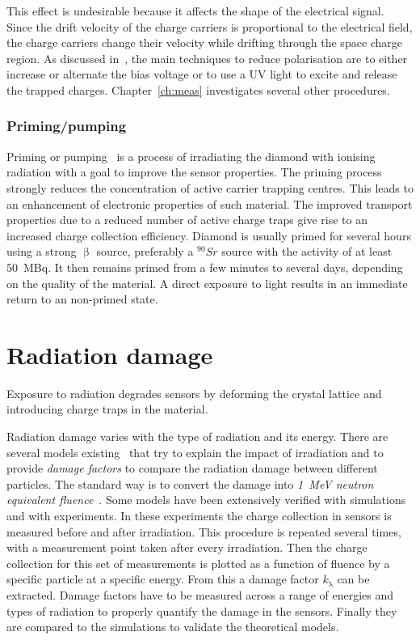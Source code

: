 This effect is undesirable because it affects the shape of the electrical signal. Since the drift velocity of the charge carriers is proportional to the electrical field, the charge carriers change their velocity while drifting through the space charge region. As discussed in~\cite{Guthoff:1977429}, the main techniques to reduce polarisation are to either increase or alternate the bias voltage or to use a UV light to excite and release the trapped charges. Chapter~\ref{ch:meas} investigates several other procedures.


\subsubsection{Priming/pumping}
Priming or pumping~\cite{pumping:00000} is a process of irradiating the diamond with ionising radiation with a goal to improve the sensor properties. The priming process strongly reduces the concentration of active carrier trapping centres. This leads to an enhancement of electronic properties of such material. The improved transport properties due to a reduced number of active charge traps give rise to an increased charge collection efficiency. Diamond is usually primed for several hours using a strong $\upbeta$ source, preferably a $^{90}Sr$ source with the activity of at least 50~MBq. It then remains primed from a few minutes to several days, depending on the quality of the material. A direct exposure to light results in an immediate return to an non-primed state.



\section{Radiation damage}
\label{sec:raddam}
Exposure to radiation degrades sensors by deforming the crystal lattice and introducing charge traps in the material. 

Radiation damage varies with the type of radiation and its energy. There are several models existing~\cite{2002NIMPA,Guthoff:2014223} that try to explain the impact of irradiation and to provide \emph{damage factors} to compare the radiation damage between different particles. The standard way is to convert the damage into \emph{1~MeV neutron equivalent fluence}~\cite{NEQ:00000}. Some models have been extensively verified with simulations and with experiments. In these experiments the charge collection in sensors is measured before and after irradiation. This procedure is repeated several times, with a measurement point taken after every irradiation. Then the charge collection for this set of measurements is plotted as a function of fluence by a specific particle at a specific energy. From this a damage factor $k_\mathrm{\lambda}$ can be extracted. Damage factors have to be measured across a range of energies and types of radiation to properly quantify the damage in the sensors. Finally they are compared to the simulations to validate the theoretical models.

